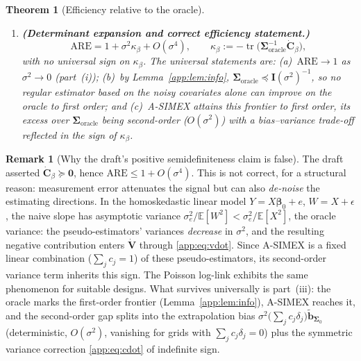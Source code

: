 \documentclass[11pt]{article}
\theoremstyle{plain}
\newtheorem{theorem}{Theorem}
\theoremstyle{definition}
\newtheorem{remark}{Remark}
\newcommand{\E}{\mathbb{E}}
\newcommand{\bet}{\bm{\beta}}
\newcommand{\bSig}{\bm{\Sigma}}
\newcommand{\btH}{\bm{H}}
\newcommand{\btV}{\bm{V}}
\newcommand{\asimex}{\textup{A-SIMEX}}
\begin{document}
\begin{theorem}[Efficiency relative to the oracle]
\begin{enumerate}
      function. Symmetry of $\dot{\btH}_j$ and $\dot{\btV}$ is immediate
      from \eqref{app:eq:hdot}--\eqref{app:eq:vdot}, and
      \eqref{app:eq:cdot} is a congruence-like transform of symmetric
      matrices, hence $\dot{\bm C}_\beta$ is symmetric.
      In general, however, $\dot{\bm C}_\beta$ is
      \emph{indefinite}: neither
      $\dot{\bm C}_\beta\succeq\bm 0$ nor
      $\dot{\bm C}_\beta\preceq\bm 0$ holds universally, and the
      sign of
      $\operatorname{tr}\bigl(\bSig_{\mathrm{oracle}}^{-1}
      \dot{\bm C}_\beta\bigr)$ depends on the design, the grid, and the
      degree (see Remark~\ref{app:rem:psd}).
\item[(iii)] \textbf{(Determinant expansion and correct efficiency
      statement.)}
      \[
        \mathrm{ARE}=1+\sigma^2\kappa_\beta+O(\sigma^4),
        \qquad
        \kappa_\beta:=-\operatorname{tr}\!\bigl(
          \bSig_{\mathrm{oracle}}^{-1}\dot{\bm C}_\beta\bigr),
      \]
      with no universal sign on $\kappa_\beta$. The universal
      statements are: (a)~$\mathrm{ARE}\to1$ as $\sigma^2\to0$
      (part~(i)); (b)~by Lemma~\ref{app:lem:info},
      $\bSig_{\mathrm{oracle}}\preceq\bm I(\sigma^2)^{-1}$, so no
      regular estimator based on the noisy covariates alone can improve
      on the oracle to first order; and (c)~\asimex{} attains this
      frontier to first order, its excess over
      $\bSig_{\mathrm{oracle}}$ being second-order
      ($O(\sigma^2)$) with a bias--variance trade-off reflected in the
      sign of $\kappa_\beta$.
\end{enumerate}
\end{theorem}

\begin{remark}[Why the draft's positive semidefiniteness claim is
false]\label{app:rem:psd}
The draft asserted $\dot{\bm C}_\beta\succeq\bm 0$, hence
$\mathrm{ARE}\le1+O(\sigma^4)$. This is not correct, for a structural
reason: measurement error attenuates the signal but can also
\emph{de-noise} the estimating directions. In the homoskedastic linear
model $Y=X\bet_0+e$, $W=X+\epsilon$, the naive slope has asymptotic variance
$\sigma_e^2/\E[W^2]<\sigma_e^2/\E[X^2]$, the oracle variance: the
pseudo-estimators' variances \emph{decrease} in $\sigma^2$, and the
resulting negative contribution enters $\dot{\btV}$ through
\eqref{app:eq:vdot}. Since \asimex{} is a fixed linear combination
($\sum_jc_j=1$) of these pseudo-estimators, its second-order variance
term inherits this sign. The Poisson log-link exhibits the same
phenomenon for suitable designs. What survives universally is
part~(iii): the oracle marks the first-order frontier
(Lemma~\ref{app:lem:info}), \asimex{} reaches it, and the second-order gap
splits into the extrapolation bias
$\sigma^2\bigl(\sum_jc_j\delta_j\bigr)\tilde{\bm b}_{\bSig_0}$
(deterministic, $O(\sigma^2)$, vanishing for grids with
$\sum_jc_j\delta_j=0$) plus the symmetric variance correction
\eqref{app:eq:cdot} of indefinite sign.
\end{remark}
\end{document}
